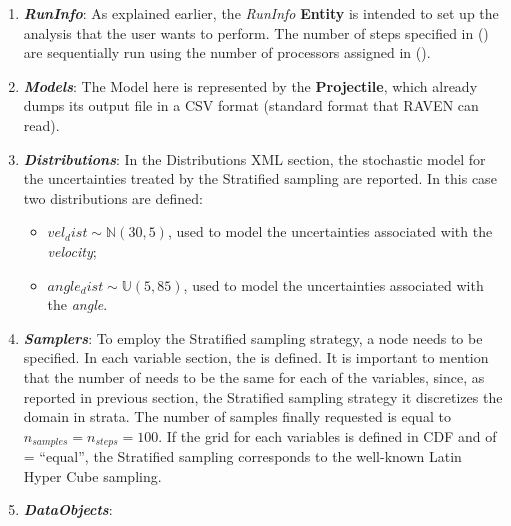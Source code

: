 \begin{enumerate}
   \item \textbf{\textit{RunInfo}}:
   As explained earlier, the \textit{RunInfo} \textbf{Entity} is intended to set up the analysis that the user wants to perform. The number of steps specified in () are sequentially run using the number of processors assigned in ().
   \item \textbf{\textit{Models}}:
 The Model here is represented by the
 \textbf{Projectile}, which already dumps its output file in a
 CSV format (standard format that RAVEN can read).
   \item \textbf{\textit{Distributions}}:
  In the Distributions XML section, the stochastic model for the
  uncertainties  treated by the Stratified sampling are reported. In
  this case two distributions are defined:
  \begin{itemize}
    \item $vel_dist \sim \mathbb{N}(30,5)$, used to model the uncertainties
    associated with  the \textit{velocity};
    \item  $angle_dist \sim \mathbb{U}(5,85)$,  used to
    model the uncertainties associated with the \textit{angle}.
  \end{itemize}
   \item \textbf{\textit{Samplers}}:
  To employ the Stratified sampling strategy, a
   node needs to be specified. In each variable section, the   is defined.
  It is important to mention that the number of  needs to be the same for each of the variables,  since, as reported in previous section, the Stratified sampling strategy it discretizes the domain in strata.
  The number of samples finally requested is equal to $n_{samples} = n_{steps} = 100$.
  If the grid for each variables is defined in CDF and of   = ``equal'', the Stratified sampling corresponds to the well-known Latin Hyper Cube sampling.
   \item \textbf{\textit{DataObjects}}:

\end{enumerate}
